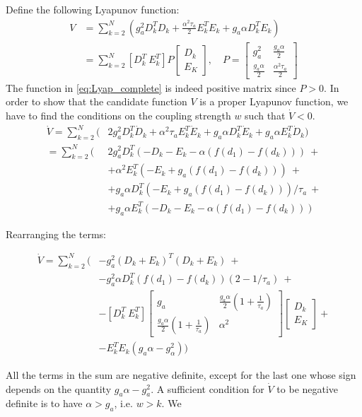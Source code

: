 Define the following Lyapunov function:
\begin{equation} 
\begin{aligned}
V &= \sum\limits_{k=2}^N( g_a^2 D_k^TD_k + 
    \frac{\alpha^2\tau_a}{2} E_k^TE_k + g_a\alpha D_k^TE_k) \\
  &= \sum\limits_{k=2}^N 
  [D_k^T\ E_k^T]
  P \begin{bmatrix}D_k \\ E_K \end{bmatrix}, \quad P = \begin{bmatrix} 
  g_a^2  & \frac{g_a\alpha}{2} \\ 
  \frac{g_a\alpha}{2} & \frac{\alpha^2\tau_a}{2}  
   \end{bmatrix} 
\end{aligned}
\label{eq:Lyap_complete}
\end{equation}
The function in \cref{eq:Lyap_complete} is indeed positive matrix since $P>0$. In order to show that the candidate function $V$ is a proper Lyapunov function,  we have to find the conditions on the coupling strength $w$ such that $\dot V<0$.
\begin{equation} 
\begin{aligned}
\dot V = \sum\limits_{k=2}^N( &2g_a^2 D_k^T\dot D_k + 
                             \alpha^2 \tau_a E_k^T \dot E_k + 
                             g_a\alpha D_k^T\dot E_k +
                             g_a\alpha E_k^T\dot D_k) \\ 
       = \sum\limits_{k=2}^N(&2g_a^2 D_k^T(- D_k - E_k - \alpha (f(d_1) - f(d_k)))\ +  \\
       & + \alpha^2 E_k^T(-E_k + g_a(f(d_1) - f(d_k)))\ + \\
       & + g_a\alpha D_k^T(-E_k + g_a(f(d_1) - f(d_k)))/\tau_a\ + \\
       & + g_a\alpha E_k^T(- D_k - E_k - \alpha (f(d_1) - f(d_k)))
\end{aligned}
\label{eq:Lyap_complete_derivative}
\end{equation}

Rearranging the terms:

\begin{equation} 
\begin{aligned}
\dot V = \sum\limits_{k=2}^N(&-g_a^2(D_k+E_k)^T(D_k+E_k)\ + \\ 
& - g_a^2\alpha D_k^T(f(d_1) - f(d_k))(2-1/\tau_a)\ + \\
& - [D_k^T\ E_k^T] \begin{bmatrix}g_a & \frac{g_a\alpha}{2}(1+\frac{1}{\tau_a}) \\ \frac{g_a\alpha}{2}(1+\frac{1}{\tau_a})  & \alpha^2 \end{bmatrix} \begin{bmatrix}D_k \\ E_K \end{bmatrix} + \\
& - E_k^TE_k(g_a\alpha-g_\alpha^2))
\end{aligned}
\label{eq:Lyap_complete_derivative_rarranged}
\end{equation}

All the terms in the sum are negative definite, except for the last one whose sign depends on the quantity $g_a\alpha-g_a^2$. A sufficient condition for $\dot V$ to be negative definite is to have $\alpha > g_a$, i.e. $w>k$.  We
